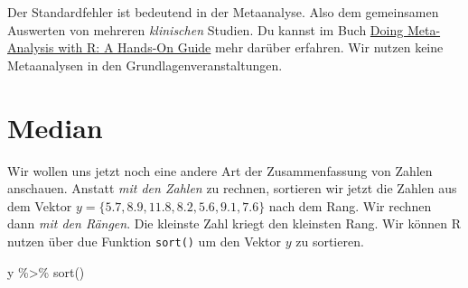 \documentclass[
  letterpaper,
]{scrbook}
\newenvironment{Shaded}{\begin{snugshade}}{\end{snugshade}}
\newcommand{\FunctionTok}[1]{\textcolor[rgb]{0.28,0.35,0.67}{#1}}
\newcommand{\NormalTok}[1]{\textcolor[rgb]{0.00,0.23,0.31}{#1}}
\newcommand{\SpecialCharTok}[1]{\textcolor[rgb]{0.37,0.37,0.37}{#1}}
\begin{document}

\begin{tcolorbox}[enhanced jigsaw, coltitle=black, titlerule=0mm, bottomrule=.15mm, opacityback=0, opacitybacktitle=0.6, leftrule=.75mm, title=\textcolor{quarto-callout-note-color}{\faInfo}\hspace{0.5em}{Standardfehler wird in der Metaanalyse genutzt}, toprule=.15mm, bottomtitle=1mm, toptitle=1mm, left=2mm, breakable, arc=.35mm, colback=white, rightrule=.15mm, colbacktitle=quarto-callout-note-color!10!white, colframe=quarto-callout-note-color-frame]
Der Standardfehler ist bedeutend in der Metaanalyse. Also dem
gemeinsamen Auswerten von mehreren \emph{klinischen} Studien. Du kannst
im Buch
\href{https://bookdown.org/MathiasHarrer/Doing_Meta_Analysis_in_R/effects.html}{Doing
Meta-Analysis with R: A Hands-On Guide} mehr darüber erfahren. Wir
nutzen keine Metaanalysen in den Grundlagenveranstaltungen.
\end{tcolorbox}

\hypertarget{median}{%
\section{Median}\label{median}}

Wir wollen uns jetzt noch eine andere Art der Zusammenfassung von Zahlen
anschauen. Anstatt \emph{mit den Zahlen} zu rechnen, sortieren wir jetzt
die Zahlen aus dem Vektor \(y = \{5.7, 8.9, 11.8, 8.2, 5.6, 9.1, 7.6\}\)
nach dem Rang. Wir rechnen dann \emph{mit den Rängen}. Die kleinste Zahl
kriegt den kleinsten Rang. Wir können R nutzen über due Funktion
\texttt{sort()} um den Vektor \(y\) zu sortieren.

\begin{Shaded}
\begin{Highlighting}[]
\NormalTok{y }\SpecialCharTok{\%\textgreater{}\%} \FunctionTok{sort}\NormalTok{()}
\end{Highlighting}
\end{Shaded}
\end{document}
